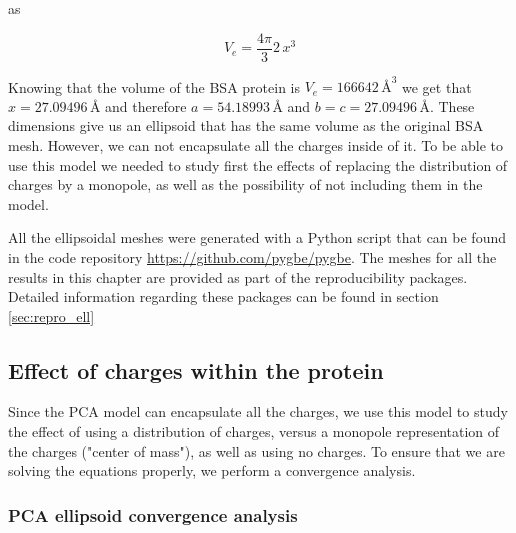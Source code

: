 as 

\begin{equation}
    V_e = \frac{4\pi}{3}2\,x^3
\end{equation}

Knowing that the volume of the BSA protein is $V_e = 166642 \, \text{\AA}^3$ we get that $x=27.09496 \, \text{\AA}$ 
and therefore $a=54.18993 \, \text{\AA}$ and $b=c=27.09496 \, \text{\AA}$. These dimensions give us an ellipsoid that has the same volume 
as the original BSA mesh. However, we can not encapsulate all the charges inside of it. To be able to use this model we needed to study first the 
effects of replacing the distribution of charges by a monopole, as well as the possibility of not including them in the model. 

All the ellipsoidal meshes were generated with a Python script that can be found in the code repository \url{https://github.com/pygbe/pygbe}. The
meshes for all the results in this chapter are provided as part of the reproducibility packages. Detailed information regarding these packages can be 
found in section \ref{sec:repro_ell}

\subsection{Effect of charges within the protein}

Since the PCA model can encapsulate all the charges, we use this model to study the effect of using a distribution of charges, versus
a monopole representation of the charges ("center of mass"), as well as using no charges. To ensure that we are solving the equations 
properly, we perform a convergence analysis.

\subsubsection{PCA ellipsoid convergence analysis}

